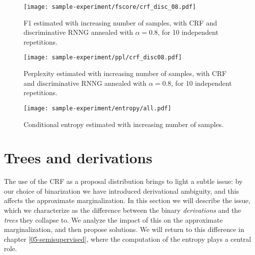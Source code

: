     \begin{figure}[h]
      \center
    	\texttt{[image: sample-experiment/fscore/crf\_disc\_08.pdf]}
      \caption{F1 estimated with increasing number of samples, with CRF and discriminative RNNG annealed with $\alpha=0.8$, for 10 independent repetitions.}
      \label{fig:samples-fscores}
    \end{figure}

    \begin{figure}[h]
      \center
    	\texttt{[image: sample-experiment/ppl/crf\_disc08.pdf]}
      \caption{Perplexity estimated with increasing number of samples, with CRF and discriminative RNNG annealed with $\alpha=0.8$, for 10 independent repetitions.}
      \label{fig:samples-perplexities}

      \texttt{[image: sample-experiment/entropy/all.pdf]}
      \caption{Conditional entropy estimated with increasing number of samples.}
      \label{fig:samples-entropy}
    \end{figure}
    \restoregeometry

\section{Trees and derivations}
  The use of the CRF as a proposal distribution brings to light a subtle issue: by our choice of binarization we have introduced derivational ambiguity, and this affects the approximate marginalization. In this section we will describe the issue, which we characterize as the difference between the binary \textit{derivations} and the \textit{trees} they collapse to. We analyze the impact of this on the approximate marginalization, and then propose solutions. We will return to this difference in chapter \ref{05-semisupervised}, where the computation of the entropy plays a central role.

